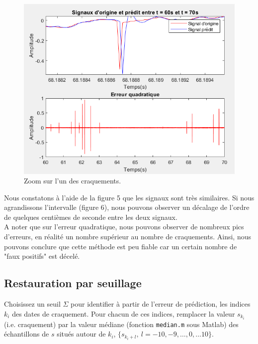 \documentclass{article}
\begin{document}
\begin{figure}[!h]
    \centering
    \includegraphics[width=1\textwidth]{images/zoom.png}
    \caption{Zoom sur l'un des craquements.}
    \label{fig-binaire}
\end{figure}

Nous constatons à l'aide de la figure 5 que les signaux sont très similaires. Si nous agrandissons l'intervalle (figure 6),  nous pouvons observer un décalage de l'ordre de quelques centièmes de seconde entre les deux signaux.\\ 
A noter que sur l'erreur quadratique, nous pouvons observer  de nombreux pics d'erreurs, en réalité un nombre supérieur au nombre de craquements. Ainsi, nous pouvons conclure que cette méthode est peu fiable car un certain nombre de "faux positifs" est décelé.\\
\clearpage

\subsection{Restauration par seuillage}

Choisissez un seuil $\Sigma$ pour identifier à partir de l'erreur de prédiction, les indices $k_i$ des dates de craquement.  Pour chacun de ces indices,  remplacer la valeur $s_{k_i}$ (i.e. craquement) par la valeur médiane (fonction {\tt median.m} sous Matlab) des échantillons de $s$ situés autour de $k_i$, $\{s_{k_i+l},~l=-10, -9,\ldots, 0 , \ldots 10\}$.
\end{document}
